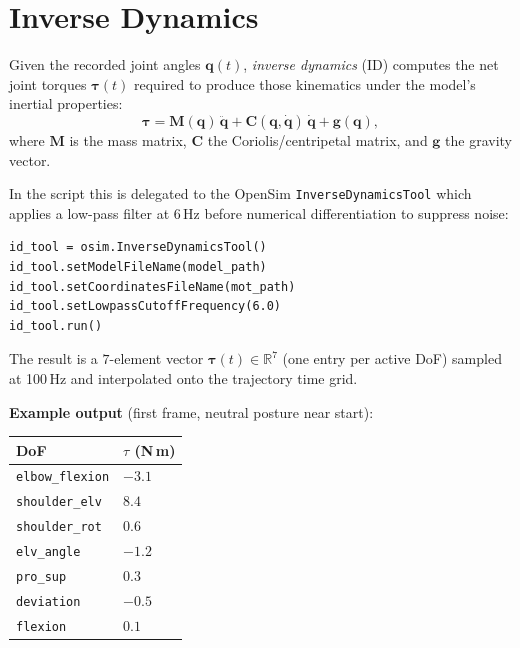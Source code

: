 \documentclass[11pt,a4paper]{article}
\begin{document}
\section{Inverse Dynamics}

Given the recorded joint angles $\bm{q}(t)$, \emph{inverse dynamics} (ID)
computes the net joint torques $\bm{\tau}(t)$ required to produce those
kinematics under the model's inertial properties:
\[
  \bm{\tau} = \mathbf{M}(\bm{q})\,\ddot{\bm{q}}
             + \mathbf{C}(\bm{q},\dot{\bm{q}})\,\dot{\bm{q}}
             + \bm{g}(\bm{q}),
\]
where $\mathbf{M}$ is the mass matrix, $\mathbf{C}$ the Coriolis/centripetal
matrix, and $\bm{g}$ the gravity vector.

In the script this is delegated to the OpenSim \texttt{InverseDynamicsTool}
which applies a low-pass filter at $6\,$Hz before numerical differentiation
to suppress noise:

\begin{lstlisting}[caption={ID tool setup}]
id_tool = osim.InverseDynamicsTool()
id_tool.setModelFileName(model_path)
id_tool.setCoordinatesFileName(mot_path)
id_tool.setLowpassCutoffFrequency(6.0)
id_tool.run()
\end{lstlisting}

The result is a $7$-element vector $\bm{\tau}(t) \in \mathbb{R}^7$ (one
entry per active DoF) sampled at 100\,Hz and interpolated onto the
trajectory time grid.

\textbf{Example output} (first frame, neutral posture near start):
\begin{center}
\begin{tabular}{ll}
\toprule
DoF & $\tau$ (N\,m) \\
\midrule
\texttt{elbow\_flexion} & $-3.1$ \\
\texttt{shoulder\_elv}  & $ 8.4$ \\
\texttt{shoulder\_rot}  & $ 0.6$ \\
\texttt{elv\_angle}     & $-1.2$ \\
\texttt{pro\_sup}       & $ 0.3$ \\
\texttt{deviation}      & $-0.5$ \\
\texttt{flexion}        & $ 0.1$ \\
\bottomrule
\end{tabular}
\end{center}
\end{document}
